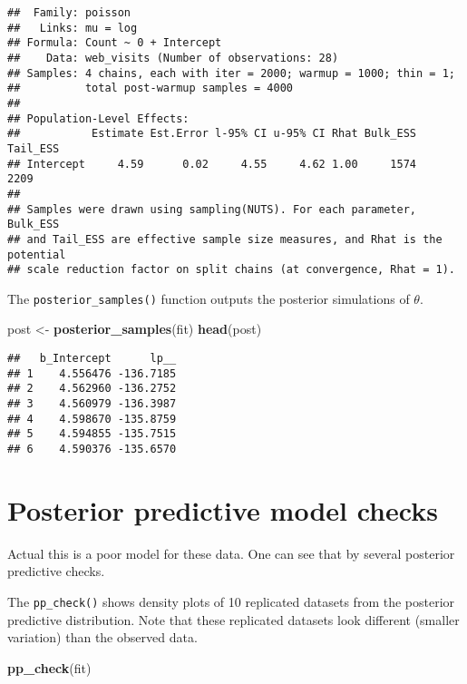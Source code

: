 \documentclass[
]{book}
\newenvironment{Shaded}{\begin{snugshade}}{\end{snugshade}}
\newcommand{\KeywordTok}[1]{\textcolor[rgb]{0.13,0.29,0.53}{\textbf{#1}}}
\newcommand{\NormalTok}[1]{#1}
\newcommand{\StringTok}[1]{\textcolor[rgb]{0.31,0.60,0.02}{#1}}
\begin{document}
\begin{verbatim}
##  Family: poisson 
##   Links: mu = log 
## Formula: Count ~ 0 + Intercept 
##    Data: web_visits (Number of observations: 28) 
## Samples: 4 chains, each with iter = 2000; warmup = 1000; thin = 1;
##          total post-warmup samples = 4000
## 
## Population-Level Effects: 
##           Estimate Est.Error l-95% CI u-95% CI Rhat Bulk_ESS Tail_ESS
## Intercept     4.59      0.02     4.55     4.62 1.00     1574     2209
## 
## Samples were drawn using sampling(NUTS). For each parameter, Bulk_ESS
## and Tail_ESS are effective sample size measures, and Rhat is the potential
## scale reduction factor on split chains (at convergence, Rhat = 1).
\end{verbatim}

The \texttt{posterior\_samples()} function outputs the posterior simulations of \(\theta\).

\begin{Shaded}
\begin{Highlighting}[]
\NormalTok{post <-}\StringTok{ }\KeywordTok{posterior_samples}\NormalTok{(fit)}
\KeywordTok{head}\NormalTok{(post)}
\end{Highlighting}
\end{Shaded}

\begin{verbatim}
##   b_Intercept      lp__
## 1    4.556476 -136.7185
## 2    4.562960 -136.2752
## 3    4.560979 -136.3987
## 4    4.598670 -135.8759
## 5    4.594855 -135.7515
## 6    4.590376 -135.6570
\end{verbatim}

\hypertarget{posterior-predictive-model-checks}{%
\section{Posterior predictive model checks}\label{posterior-predictive-model-checks}}

Actual this is a poor model for these data. One can see that by several posterior predictive checks.

The \texttt{pp\_check()} shows density plots of 10 replicated datasets from the posterior predictive distribution. Note that these replicated datasets look different (smaller variation) than the observed data.

\begin{Shaded}
\begin{Highlighting}[]
\KeywordTok{pp_check}\NormalTok{(fit)}
\end{Highlighting}
\end{Shaded}
\end{document}
